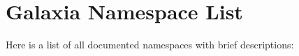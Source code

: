 \section{Galaxia Namespace List}
Here is a list of all documented namespaces with brief descriptions:\begin{CompactList}
\item{}
\end{CompactList}
